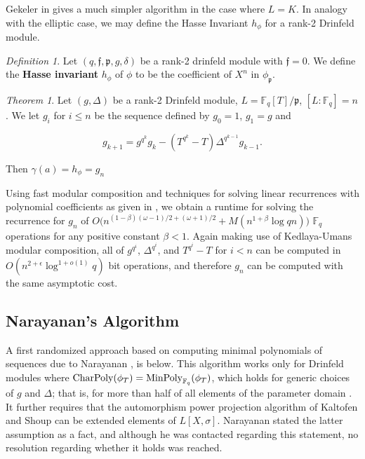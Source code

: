 \documentclass{jams-l}
\theoremstyle{remark}
\numberwithin{equation}{section}
\newtheorem{definition}{Definition}
\newtheorem{theorem}{Theorem}
\newcommand{\minpol}{\textnormal{MinPoly}_{\mathbb{F}_q}}
\begin{document}
Gekeler in \cite{frobdist} gives a much simpler algorithm in the case where $L = K$. In analogy with the elliptic case, we may define the Hasse Invariant $h_{\phi}$ for a rank-2 Drinfeld module. 
\begin{definition}
Let $(q, \mathfrak{f}, \mathfrak{p}, g, \delta)$ be a rank-2 drinfeld module with $\mathfrak{f} = 0$. We define the \textbf{Hasse invariant} $h_{\phi}$ of $\phi$ to be the coefficient of $X^{n}$ in $\phi_{\mathfrak{p}}$.
\end{definition}


\begin{theorem}

Let $(g,\Delta)$ be a rank-2 Drinfeld module, $L = \mathbb{F}_q[T]/\mathfrak{p}$, $[L : \mathbb{F}_q] = n$. We let $g_i$ for $i \leq n$ be the sequence defined by $g_0 = 1$, $g_1 = g$ and

\[ g_{k+1} = g^{q^{k}} g_{k} - (T^{q^{k}} - T) \Delta^{q^{k-1}} g_{k-1}.\]

\noindent Then $\gamma(a) = h_{\phi} = g_n$

\end{theorem}

Using fast modular composition and techniques for solving linear recurrences with polynomial coefficients as given in \cite{eschost2017arXiv171200669D}, we obtain a runtime for solving the recurrence for $g_n$ of $O\big(n^{(1-\beta)(\omega - 1)/2 + (\omega + 1)/2 } + M(n^{1 + \beta} \log qn) \big)$ $\mathbb{F}_q$ operations for any positive constant $\beta < 1$. Again making use of Kedlaya-Umans modular composition, all of $g^{q^i}$, $\Delta^{q^i}$, and $T^{q^i} - T$ for $i < n$ can be computed in $O( n^{2 + \epsilon} \log^{1 + o(1)} q)$ bit operations, and therefore $g_n$ can be computed with the same asymptotic cost.

\subsection{Narayanan's Algorithm}

A first randomized approach based on computing minimal polynomials of sequences due to Narayanan \cite[3.1]{DBLP:journals/corr/Narayanan15}, is below. This algorithm works only for Drinfeld modules where $\textnormal{CharPoly}(\phi_T) = \minpol(\phi_T)$, which holds for generic choices of $g$ and $\Delta$; that is, for more than half of all elements of the parameter domain \cite[theorem 3.6]{DBLP:journals/corr/Narayanan15}. It further requires that the automorphism power projection algorithm of Kaltofen and Shoup can be extended elements of $L[X,\sigma]$. Narayanan stated the latter assumption as a fact, and although he was contacted regarding this statement, no resolution regarding whether it holds was reached.
\end{document}
